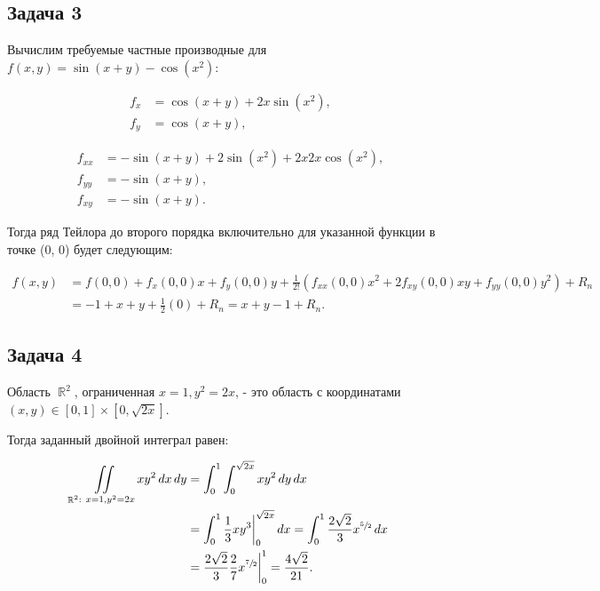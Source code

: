 \documentclass[a4paper,11pt]{article}
\DeclareMathOperator*{\R}{\mathbb{R}}   %
\begin{document}
\subsection{Задача 3}

Вычислим требуемые частные производные для $f(x, y) = \sin (x+y) - \cos (x^2)$:

\begin{minipage}{0.4\linewidth}
\begin{align*}
f_x & = \cos (x+y) + 2x \sin (x^2), \\
f_y & = \cos (x+y),
\end{align*}
\end{minipage}
\begin{minipage}{0.6\linewidth}
	\begin{align*}
f_{xx} & = -\sin (x+y)  + 2 \sin (x^2) + 2x 2x \cos (x^2), \\
f_{yy} & = -\sin (x+y), \\
f_{xy} & = -\sin (x+y).
\end{align*}
\end{minipage}

Тогда ряд Тейлора до второго порядка включительно для указанной функции в точке (0, 0) будет следующим:

\begin{align*}
f(x, y) & = f(0, 0) + f_x(0, 0)x + f_y(0, 0)y + \frac{1}{2!}
  (f_{xx}(0,0)x^2 + 2f_{xy}(0,0)xy + f_{yy}(0,0)y^2) + R_n \\
   & = -1 + x + y + \frac{1}{2}(0) + R_n = x + y - 1 + R_n.
\end{align*}

\subsection{Задача 4}

Область $\R^2$, ограниченная $x = 1, y^2 = 2x$, - это область с координатами $(x, y) \in [0, 1] \times [0, \sqrt{2x}]$.

Тогда заданный двойной интеграл равен:

\begin{align*}
\iint \limits_{\R^2:\ x = 1, y^2 = 2x} xy^2\,dx\,dy 
& = \int_{0}^{1} \int_{0}^{\sqrt{2x}} xy^2\,dy\,dx \\
& = \int_{0}^{1} \frac{1}{3}xy^3 \bigg \rvert_{0}^{\sqrt{2x}} \,dx 
  = \int_{0}^{1} \frac{2\sqrt{2}}{3}x^{\sfrac{5}{2}} \,dx \\
& = \frac{2\sqrt{2}}{3} \frac{2}{7} x^{\sfrac{7}{2}} \bigg \rvert_{0}^{1} = \frac{4\sqrt{2}}{21}.
\end{align*}
\end{document}
